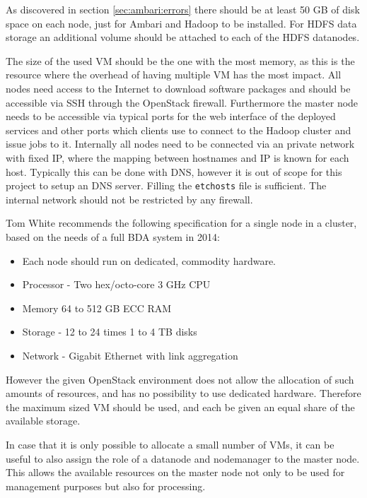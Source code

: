 As discovered in section \vref{sec:ambari:errors} there should be at least 50 \ac{GB} of disk space on each node, 
just for Ambari and Hadoop to be installed.
For \ac{HDFS} data storage an additional volume should be attached to each of the \ac{HDFS} datanodes.

The size of the used \acs{VM} should be the one with the most memory, 
as this is the resource where the overhead of having multiple \acs{VM} has the most impact.
All nodes need access to the Internet to download software packages and should be accessible via \ac{SSH} through the OpenStack firewall.
Furthermore the master node needs to be accessible via typical ports for the web interface of the deployed services and other ports which clients use to connect to the Hadoop cluster and issue jobs to it.
Internally all nodes need to be connected via an private network with fixed \acs{IP}, where the mapping between hostnames and \acs{IP} is known for each host. Typically this can be done with \ac{DNS}, however it is out of scope for this project to setup an \ac{DNS} server. Filling the \texttt{\/etc\/hosts} file is sufficient.
The internal network should not be restricted by any firewall.

Tom White recommends the following specification for a single node in a cluster, based on the needs of a full \ac{BDA} system in 2014:\\

\begin{itemize}
    \item Each node should run on dedicated, commodity hardware.
    \item Processor - Two hex/octo-core 3 GHz \acs{CPU}
    \item Memory 64 to 512 \ac{GB} \ac{ECC} \ac{RAM}
    \item Storage - 12 to 24 times 1 to 4 \ac{TB} disks
    \item Network - Gigabit Ethernet with link aggregation
\end{itemize}
\autocite{white2015hadoop}

However the given OpenStack environment does not allow the allocation of such amounts of resources, and has no possibility to use dedicated hardware. 
Therefore the maximum sized \acs{VM} should be used, and each be given an equal share of the available storage.

In case that it is only possible to allocate a small number of \acp{VM}, it can be useful to also assign the role of a datanode and nodemanager to the master node. This allows the available resources on the master node not only to be used for management purposes but also for processing.

